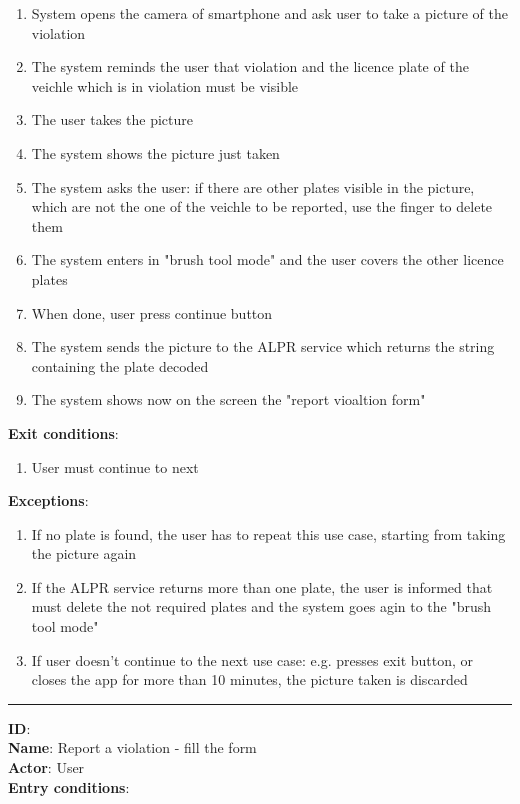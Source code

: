 \begin{enumerate}
\begin{itemize}
\begin{enumerate}
      \item{System opens the camera of smartphone and ask user to take a picture of the violation}
      \item{The system reminds the user that violation and the licence plate of the veichle which is in violation must be visible }
      \item{The user takes the picture }
      \item{The system shows the picture just taken }
      \item{The system asks the user: if there are other plates visible in the picture, which are not the one of the veichle to be reported, use the finger to delete them }
      \item{The system enters in "brush tool mode" and the user covers the other licence plates}
      \item{When done, user press continue button}
      \item{The system sends the picture to the ALPR service which returns the string containing the plate decoded}
      \item{The system shows now on the screen the "report vioaltion form"}
    \end{enumerate}
    \textbf{Exit conditions}:
    \begin{enumerate}
      \item{User must continue to next }
    \end{enumerate}
    \textbf{Exceptions}:
    \begin{enumerate}
      \item{If no plate is found, the user has to repeat this use case, starting from taking the picture again}
      \item{If the ALPR service returns more than one plate, the user is informed that must delete the not required plates and the system goes agin to the "brush tool mode"}
      \item{If user doesn't continue to the next use case: e.g. presses exit button, or closes the app for more than 10 minutes, the picture taken is discarded}
    \end{enumerate}
    \rule{\linewidth}{0.4pt}
    \textbf{ID}:  \\
    \textbf{Name}: Report a violation - fill the form \\
    \textbf{Actor}: User   \\
    \textbf{Entry conditions}:
    \begin{enumerate}

\end{enumerate}
\end{itemize}
\end{enumerate}
